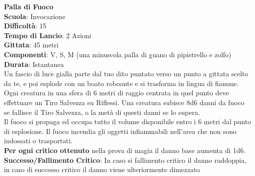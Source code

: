 \begin{multicols}{2}
\medskip\textbf{Palla di Fuoco}\\
\textbf{Scuola}: Invocazione\\
\textbf{Difficoltà}: 15\\
\textbf{Tempo di Lancio}: 2 Azioni\\
\textbf{Gittata}: 45 metri\\
\textbf{Componenti}: V, S, M (una minuscola palla di guano di pipistrello e zolfo)\\
\textbf{Durata}: Istantanea\\
Un fascio di luce gialla parte dal tuo dito puntato verso un punto a gittata scelto da te, e poi esplode con un boato roboante e si trasforma in lingua di fiamme.\\
Ogni creatura in una sfera di 6 metri di raggio centrata in quel punto deve effettuare un Tiro Salvezza su Riflessi. Una creatura subisce 8d6 danni da fuoco se fallisce il Tiro Salvezza, o la metà di questi danni se lo supera.\\
Il fuoco si propaga ed occupa tutto il volume disponibile entro i 6 metri dal punto di esplosione. Il fuoco incendia gli oggetti infiammabili nell'area che non sono indossati o trasportati.\\
\textbf{Per ogni critico ottenuto} nella prova di magia il danno base aumenta di 1d6.\\
\textbf{Successo/Fallimento Critico}: In caso si fallimento critico il danno raddoppia, in caso di successo critico il danno viene ulteriormente dimezzato


\end{multicols}
